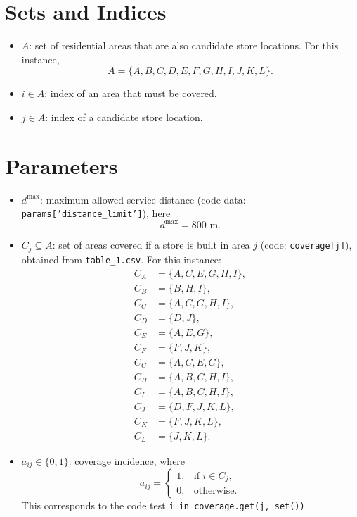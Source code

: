 \section*{Sets and Indices}

\begin{itemize}
    \item $A$: set of residential areas that are also candidate store locations. For this instance,
    \[
    A=\{A,B,C,D,E,F,G,H,I,J,K,L\}.
    \]
    \item $i \in A$: index of an area that must be covered.
    \item $j \in A$: index of a candidate store location.
\end{itemize}

\section*{Parameters}

\begin{itemize}
    \item $d^{\max}$: maximum allowed service distance (code data: \texttt{params['distance\_limit']}), here
    \[
    d^{\max}=800 \text{ m}.
    \]
    \item $C_j \subseteq A$: set of areas covered if a store is built in area $j$ (code: \texttt{coverage[j]}$)$, obtained from \texttt{table\_1.csv}. For this instance:
    \begin{align*}
    C_A &= \{A,C,E,G,H,I\},\\
    C_B &= \{B,H,I\},\\
    C_C &= \{A,C,G,H,I\},\\
    C_D &= \{D,J\},\\
    C_E &= \{A,E,G\},\\
    C_F &= \{F,J,K\},\\
    C_G &= \{A,C,E,G\},\\
    C_H &= \{A,B,C,H,I\},\\
    C_I &= \{A,B,C,H,I\},\\
    C_J &= \{D,F,J,K,L\},\\
    C_K &= \{F,J,K,L\},\\
    C_L &= \{J,K,L\}.
    \end{align*}
    \item $a_{ij} \in \{0,1\}$: coverage incidence, where
    \[
    a_{ij}=
    \begin{cases}
    1, & \text{if } i \in C_j,\\
    0, & \text{otherwise}.
    \end{cases}
    \]
    This corresponds to the code test \texttt{i in coverage.get(j, set())}.
\end{itemize}

